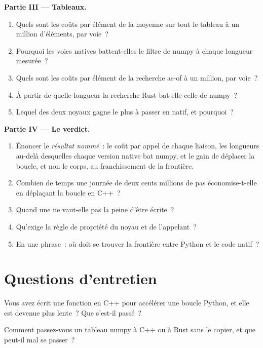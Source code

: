 \begin{problem}
\medskip\noindent\textbf{Partie III --- Tableaux.}
\begin{enumerate}[resume]
\item Quels sont les coûts par élément de la moyenne sur tout le tableau à un million d'éléments, par voie~?
\item Pourquoi les voies natives battent-elles le filtre de numpy à chaque longueur mesurée~?
\item Quels sont les coûts par élément de la recherche as-of à un million, par voie~?
\item À partir de quelle longueur la recherche Rust bat-elle celle de numpy~?
\item Lequel des deux noyaux gagne le plus à passer en natif, et pourquoi~?
\end{enumerate}

\medskip\noindent\textbf{Partie IV --- Le verdict.}
\begin{enumerate}[resume]
\item Énoncer le \emph{résultat nommé}~: le coût par appel de chaque liaison, les longueurs au-delà desquelles chaque version native bat numpy, et le
gain de déplacer la boucle, et non le corps, au franchissement de la frontière.
\item Combien de temps une journée de deux cents millions de pas économise-t-elle en déplaçant la boucle en C++~?
\item Quand une  ne vaut-elle pas la peine d'être écrite~?
\item Qu'exige la règle de propriété du noyau et de l'appelant~?
\item En une phrase~: où doit se trouver la frontière entre Python et le code natif~?
\end{enumerate}
\end{problem}

\section{Questions d'entretien}

\begin{interviewq}\label{iq:pl:native-extensions:1}
Vous avez écrit une fonction en C++ pour accélérer une boucle Python, et elle est devenue plus lente~? Que s'est-il passé~?
\end{interviewq}

\begin{interviewq}\label{iq:pl:native-extensions:2}
Comment passez-vous un tableau numpy à C++ ou à Rust sans le copier, et que peut-il mal se passer~?
\end{interviewq}

